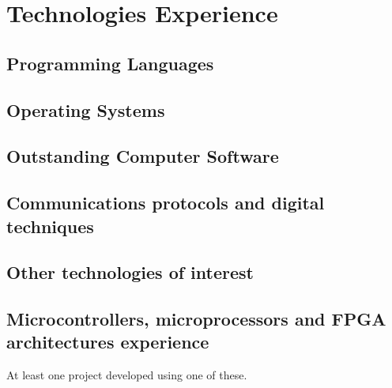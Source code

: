 
\section{Technologies Experience}
   \subsection{Programming Languages}
   \cvitem { \dicadvanced }{\proglangadvanced }
   \cvitem { \dicmedium   }{\proglangmedium }  
   \cvitem { \dicbasic    }{\proglangbasic}    

   \subsection{Operating Systems}
      \cvitem { \dicadvanced } { \osadvanced }
      \cvitem { \dicmedium   } { \osmedium   }
      \cvitem { \dicbasic    } { \osbasic    }
   \subsection{Outstanding Computer Software}
      \cvitem { \dicadvanced } { \computerprogadvanced }
      \cvitem { \dicmedium   } { \computerprogmedium   }
      \cvitem { \dicbasic    } { \computerprogbasic    }

   \subsection{Communications protocols and digital techniques}
      \cvitem{\dicadvanced }{ \protocoladvanced }
      \cvitem{\dicmedium   }{ \protocolmedium   }
      \cvitem{\dicbasic    }{ \protocolbasic    }

   \subsection{Other technologies of interest}
      \cvitem{\dicadvanced} { \othertechadvanced }
      \cvitem{\dicmedium  } { \othertechmedium   }
      \cvitem{\dicbasic   } { \othertechbasic    }


   \subsection{Microcontrollers, microprocessors and FPGA architectures experience}
      \cvitem {} { At least one project developed using one of these.}

